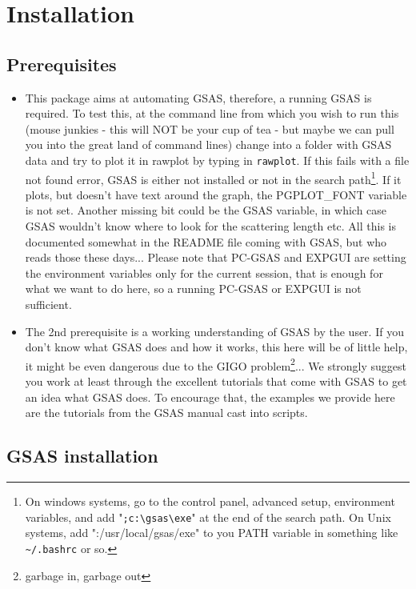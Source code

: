 \chapter{Installation}

\section{Prerequisites}

\begin{itemize}
\item This package aims at automating GSAS, therefore, a running GSAS is required. To test this, at the command line from which you wish to run this (mouse junkies - this will NOT be your cup of tea - but maybe we can pull you into the great land of command lines) change into a folder with GSAS data and try to plot it in rawplot by typing in \texttt{rawplot}. If this fails with a file not found error, GSAS is either not installed or not in the search path\footnote{On windows systems, go to the control panel, advanced setup, environment variables, and add "\texttt{;c:\textbackslash gsas\textbackslash exe}" at the end of the search path. On Unix systems, add ":/usr/local/gsas/exe" to you PATH variable in something like \texttt{\textasciitilde/.bashrc} or so.}. If it plots, but doesn't have text around the graph, the PGPLOT\_FONT variable is not set. Another missing bit could be the GSAS variable, in which case GSAS wouldn't know where to look for the scattering length etc. All this is documented somewhat in the README file coming with GSAS, but who reads those these days... Please note that PC-GSAS and EXPGUI are setting the environment variables only for the current session, that is enough for what we want to do here, so a running PC-GSAS or EXPGUI is not sufficient.
\item The 2nd prerequisite is a working understanding of GSAS by the user. If you don't know what GSAS does and how it works, this here will be of little help, it might be even dangerous due to the GIGO problem\footnote{garbage in, garbage out}... We strongly suggest you work at least through the excellent tutorials that come with GSAS to get an idea what GSAS does. To encourage that, the examples we provide here are the tutorials from the GSAS manual cast into scripts.
\end{itemize}

\section{GSAS installation}

